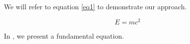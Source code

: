 \documentclass{article}
\begin{document}
We will refer to equation \cref{eq1} to demonstrate our approach.

\begin{equation}
  \label{eq1}
  E = mc^2
\end{equation}

In , we present a fundamental equation.
\end{document}
